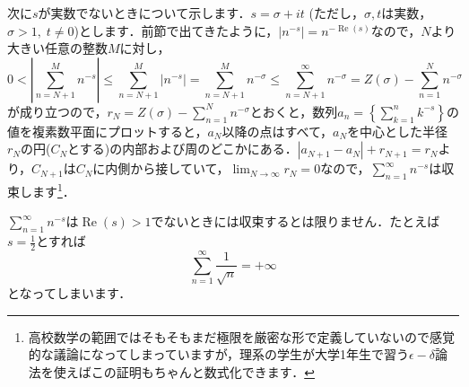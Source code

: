 \documentclass[./main]{subfile}
\begin{document}
次に$s$が実数でないときについて示します．$s=\sigma +it$ (ただし，$\sigma,t$は実数，$\sigma>1,\;t\neq 0$)とします．前節で出てきたように，$|n^{-s}|=n^{-\operatorname{Re}(s)}$なので，$N$より大きい任意の整数$M$に対し，
\[
0<\left|\sum_{n=N+1}^{M}n^{-s}\right|\leq\sum_{n=N+1}^{M}\left|n^{-s}\right|=\sum_{n=N+1}^{M}n^{-\sigma}\leq\sum_{n=N+1}^{\infty}n^{-\sigma}=Z(\sigma)-\sum_{n=1}^{N}n^{-\sigma}
\]
が成り立つので，$r_N=Z(\sigma)-\sum_{n=1}^{N}n^{-\sigma}$とおくと，数列${a_n}=\left\{\sum_{k=1}^nk^{-s}\right\}$の値を複素数平面にプロットすると，$a_N$以降の点はすべて，$a_N$を中心とした半径$r_N$の円($C_N$とする)の内部および周のどこかにある．$|a_{N+1}-a_N|+r_{N+1}=r_N$より，$C_{N+1}$は$C_N$に内側から接していて，$\lim_{N\to\infty}r_N=0$なので，$\sum_{n=1}^{\infty}n^{-s}$は収束します\footnote{高校数学の範囲ではそもそもまだ極限を厳密な形で定義していないので感覚的な議論になってしまっていますが，理系の学生が大学1年生で習う$\epsilon-\delta$論法を使えばこの証明もちゃんと数式化できます．}．

$\sum_{n=1}^{\infty}n^{-s}$は$\operatorname{Re}(s)>1$でないときには収束するとは限りません．たとえば$s=\frac{1}{2}$とすれば
\[
\sum_{n=1}^{\infty}\frac{1}{\sqrt{n}}=+\infty
\]
となってしまいます．
\end{document}
